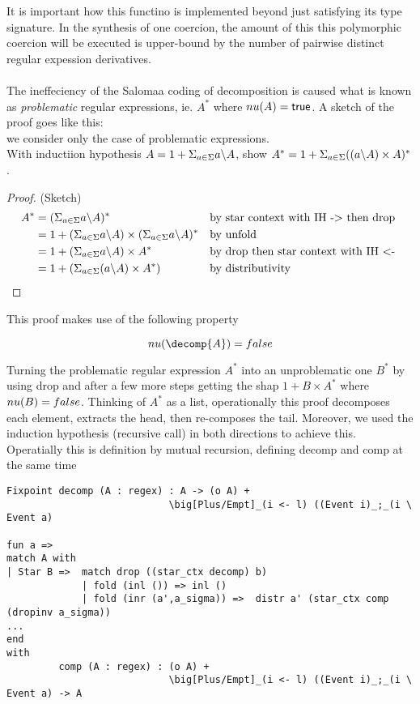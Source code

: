 \documentclass[a4paper,UKenglish,cleveref, autoref, thm-restate]{lipics-v2021}
\begin{document}
It is important how this functino is implemented beyond just satisfying its type signature. In the synthesis of one coercion, the amount of this this polymorphic coercion will be executed is upper-bound by the number of pairwise distinct regular expession derivatives.\\\\
The ineffeciency of the Salomaa coding of decomposition is caused what is known as \textit{problematic} regular expressions, ie. $A^ *$ where $\mynu{A} = \textsf{true}$. A sketch of the proof goes like this:\\
we consider only the case of problematic expressions.\\
With inductiion hypothesis $A = 1 + \Sigma_{a \in \Sigma} a \backslash A$, show $A^* = 1  + \Sigma_{a \in \Sigma} ((a \backslash A)\times A)^*$.
\begin{proof} (Sketch)
\begin{align}
A^* &= ( \Sigma_{a \in \Sigma} a \backslash A)^* &&\text{by star context with IH -> then drop}\\
 &= 1 + (\Sigma_{a \in \Sigma} a \backslash A) \times (\Sigma_{a \in \Sigma} a \backslash A)^* &&\text{by unfold}\\
 &= 1 + (\Sigma_{a \in \Sigma} a \backslash A) \times A^* && \text{by drop then star context with IH <- } \\
 &= 1 + (\Sigma_{a \in \Sigma} (a \backslash A) \times A^*) && \text{by distributivity }
\end{align}
\end{proof}
This proof makes use of the following property
\begin{lemma}
\[\mynu{\decomp{A}} = \false\]
\end{lemma}
Turning the problematic regular expression $A^*$ into an unproblematic one $B^*$ by using drop and after a few more steps getting the shap $1 + B \times A^*$ where $\mynu{B} = \false$. Thinking of $A^*$ as a list, operationally this proof decomposes each element, extracts the head, then re-composes the tail. Moreover, we used the induction hypothesis (recursive call) in both directions to achieve this. Operatially this is definition by mutual recursion, defining \textsf{decomp} and \textsf{comp} at the same time  
\begin{verbatim}
Fixpoint decomp (A : regex) : A -> (o A) +  
                            \big[Plus/Empt]_(i <- l) ((Event i)_;_(i \ Event a)

fun a =>
match A with 
| Star B =>  match drop ((star_ctx decomp) b)
             | fold (inl ()) => inl () 
             | fold (inr (a',a_sigma)) =>  distr a' (star_ctx comp (dropinv a_sigma))
...
end 
with
         comp (A : regex) : (o A) +  
                            \big[Plus/Empt]_(i <- l) ((Event i)_;_(i \ Event a) -> A
\end{verbatim}
\end{document}
